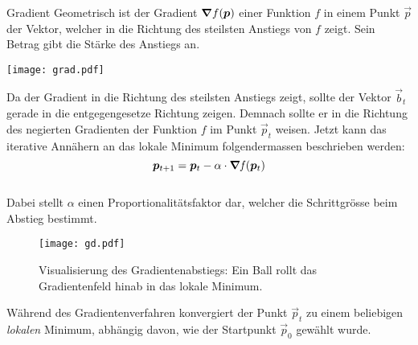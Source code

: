 \begin{appendices}
\begin{defbox}{Gradient}
  Geometrisch ist der Gradient $\bm{\nabla}f(\bm{p})$ einer Funktion $f$ in
  einem Punkt $\vec{p}$ der Vektor, welcher in die Richtung des steilsten
  Anstiegs von $f$ zeigt. Sein Betrag gibt die Stärke des Anstiegs an.
  \para{}
  \begin{center}
    \texttt{[image: grad.pdf]}
  \end{center}
\end{defbox}
\para{}
Da der Gradient in die Richtung des steilsten Anstiegs zeigt, sollte der Vektor
$\vec{b}_t$ gerade in die entgegengesetze Richtung zeigen. Demnach sollte er in die Richtung des negierten Gradienten der Funktion $f$ im Punkt $\vec{p}_t$ weisen.
Jetzt kann das iterative Annähern an das lokale Minimum folgendermassen beschrieben
werden:
\\
\begin{equation}\label{eq:gradientdescent}
  \bm{p}_{t+1} = \bm{p}_t - \alpha \cdot \bm{\nabla} \mathit{f}(\bm{p}_t)
\end{equation}
\\
Dabei stellt $\alpha$ einen Proportionalitätsfaktor dar, welcher die
Schrittgrösse beim Abstieg bestimmt.

\ifcp%
\begin{figure}[h!]
  \centering
  \texttt{[image: gd.pdf]}
  \caption{Visualisierung des Gradientenabstiegs: Ein Ball rollt das
    Gradientenfeld hinab in das lokale Minimum.}
\end{figure}
\fi%

Während des Gradientenverfahren konvergiert der Punkt $\vec{p}_t$ zu einem
beliebigen \textit{lokalen} Minimum, abhängig davon, wie der Startpunkt
$\vec{p}_0$ gewählt wurde.


\end{appendices}
